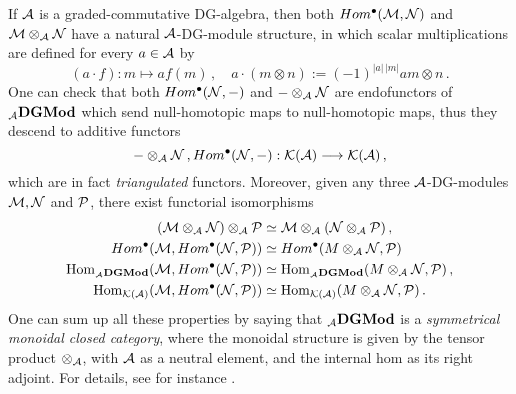 	If $\mathcal{A}$ is a graded-commutative DG-algebra, 
	then both $Hom^{\bullet}(\mathcal{M},\mathcal{N})$
	and $\mathcal{M} \otimes_{\mathcal{A}} \mathcal{N}$ have a natural $\mathcal{A}$-DG-module structure,
	in which scalar multiplications are defined for every $a \in \mathcal{A}$ by
	\begin{equation*}
		(a \cdot f) : m \mapsto af(m)\,, \quad
		a \cdot (m \otimes n) := (-1)^{|a|\,|m|} am \otimes n\,.
	\end{equation*}
	One can check that both $Hom^{\bullet}(\mathcal{N},-)$ and $- \otimes_{\mathcal{A}} \mathcal{N}$ are
	endofunctors of ${}_{\mathcal{A}}{\normalfont\textbf{DGMod}}$ which send null-homotopic maps
	to null-homotopic maps, thus they descend to additive functors
	\begin{equation*}
		- \otimes_{\mathcal{A}} \mathcal{N}\,, Hom^{\bullet}(\mathcal{N},-) : \mathcal{K}(\mathcal{A}) \longrightarrow \mathcal{K}(\mathcal{A})\,,
	\end{equation*}
	which are in fact \emph{triangulated} functors.
	Moreover, given any three $\mathcal{A}$-DG-modules $\mathcal{M},\mathcal{N}$ and $\mathcal{P}$,
	there exist functorial isomorphisms
	\begin{align*}
		(\mathcal{M} \otimes_{\mathcal{A}} \mathcal{N}) \otimes_{\mathcal{A}} \mathcal{P} &\simeq \mathcal{M} \otimes_{\mathcal{A}} (\mathcal{N} \otimes_{\mathcal{A}} \mathcal{P})\,,\\
		Hom^{\bullet}(\mathcal{M},Hom^{\bullet}(\mathcal{N},\mathcal{P})) &\simeq Hom^{\bullet}(M \otimes_{\mathcal{A}} \mathcal{N},\mathcal{P})\,\\
		\operatorname{Hom}_{{}_{\mathcal{A}}{\normalfont\textbf{DGMod}}}(\mathcal{M},Hom^{\bullet}(\mathcal{N},\mathcal{P})) &\simeq \operatorname{Hom}_{{}_{\mathcal{A}}{\normalfont\textbf{DGMod}}}(M \otimes_{\mathcal{A}} \mathcal{N},\mathcal{P})\,,\\
		\operatorname{Hom}_{\mathcal{K}(\mathcal{A})}(\mathcal{M},Hom^{\bullet}(\mathcal{N},\mathcal{P})) &\simeq \operatorname{Hom}_{\mathcal{K}(\mathcal{A})}(M \otimes_{\mathcal{A}} \mathcal{N},\mathcal{P})\,.
	\end{align*}
	One can sum up all these properties by saying that ${}_{\mathcal{A}}{\normalfont\textbf{DGMod}}$ is a
	\emph{symmetrical monoidal closed category}, where the monoidal structure
	is given by the tensor product $\otimes_{\mathcal{A}}$, with $\mathcal{A}$ as a neutral element,
	and the internal hom as its right adjoint. For details, see for instance
	\cite[\href{https://stacks.math.columbia.edu/tag/0FQ2}{Tag 0FQ2}]{stacksDGA}.
	

